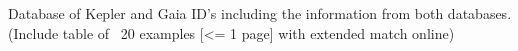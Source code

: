 



Database of Kepler and Gaia ID's including the information from both databases. (Include table of ~20 examples [<= 1 page] with extended match online)